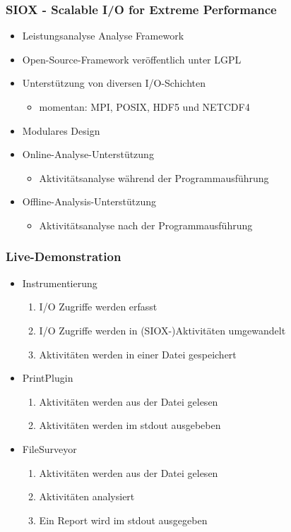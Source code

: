 \begin{frame}
	\frametitle{SIOX - Scalable I/O for Extreme Performance}
	\begin{itemize}
		\item Leistungsanalyse Analyse Framework
		\item Open-Source-Framework veröffentlich unter LGPL
		\item Unterstützung von diversen I/O-Schichten
			\begin{itemize}
				\item momentan: MPI, POSIX, HDF5 und NETCDF4
			\end{itemize}
		\item Modulares Design
		\item Online-Analyse-Unterstützung
			\begin{itemize}
				\item Aktivitätsanalyse während der Programmausführung
			\end{itemize}
		\item Offline-Analysis-Unterstützung
			\begin{itemize}
				\item Aktivitätsanalyse nach der Programmausführung
			\end{itemize}
	\end{itemize}
\end{frame}

\begin{frame}
	\frametitle{Live-Demonstration}
	\begin{itemize}
		\item Instrumentierung
			\begin{enumerate}
				\item I/O Zugriffe werden erfasst
				\item I/O Zugriffe werden in (SIOX-)Aktivitäten umgewandelt
				\item Aktivitäten werden in einer Datei gespeichert
			\end{enumerate}
		\item PrintPlugin
			\begin{enumerate}
				\item Aktivitäten werden aus der Datei gelesen
				\item Aktivitäten werden im stdout ausgebeben
			\end{enumerate}
		\item FileSurveyor
			\begin{enumerate}
				\item Aktivitäten werden aus der Datei gelesen
				\item Aktivitäten analysiert
				\item Ein Report wird im stdout ausgegeben
			\end{enumerate}
	\end{itemize}
\end{frame}

